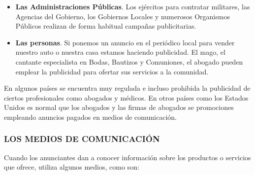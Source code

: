 
\begin{itemize}
  \item \textbf{Las Administraciones Públicas}. Los ejércitos para contratar militares, las Agencias del Gobierno, los Gobiernos Locales y numerosos Organismos Públicos realizan de forma habitual campañas publicitarias.
  \item \textbf{Las personas}. Si ponemos un anuncio en el periódico local para vender nuestro auto o nuestra casa estamos haciendo publicidad. El mago, el cantante especialista en Bodas, Bautizos y Comuniones, el abogado pueden emplear la publicidad para ofertar sus servicios a la comunidad.
\end{itemize}
En algunos países se encuentra muy regulada e incluso prohibida la publicidad de ciertos profesionales como abogados y médicos. En otros países como los Estados Unidos es normal que los abogados y las firmas de abogados se promociones empleando anuncios pagados en medios de comunicación.

\subsubsection*{LOS MEDIOS DE COMUNICACIÓN}
Cuando los anunciantes dan a conocer información sobre los productos o servicios que ofrece, utiliza algunos medios, como son:

